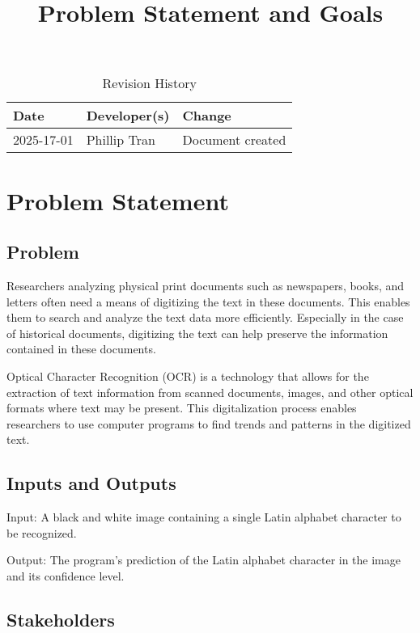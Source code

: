 \documentclass{article}
\title{Problem Statement and Goals\\\progname}
\author{\authname}
\date{}
\begin{document}
\maketitle

\begin{table}[hp]
\caption{Revision History} \label{TblRevisionHistory}
\begin{tabularx}{\textwidth}{llX}
\toprule
\textbf{Date} & \textbf{Developer(s)} & \textbf{Change}\\
\midrule
2025-17-01 & Phillip Tran & Document created \\
\bottomrule
\end{tabularx}
\end{table}

\section{Problem Statement}

\subsection{Problem}

Researchers analyzing physical print documents such as newspapers, books, and
letters often need a means of digitizing the text in these documents. This
enables them to search and analyze the text data more efficiently. Especially
in the case of historical documents, digitizing the text can help preserve the
information contained in these documents.

Optical Character Recognition (OCR) is a technology that allows for the
extraction of text information from scanned documents, images, and other optical
formats where text may be present. This digitalization process enables
researchers to use computer programs to find trends and patterns in the
digitized text.


\subsection{Inputs and Outputs}

Input: A black and white image containing a single Latin alphabet character to
be recognized.

Output: The program's prediction of the Latin alphabet character in the image
and its confidence level.

\subsection{Stakeholders}
\end{document}

